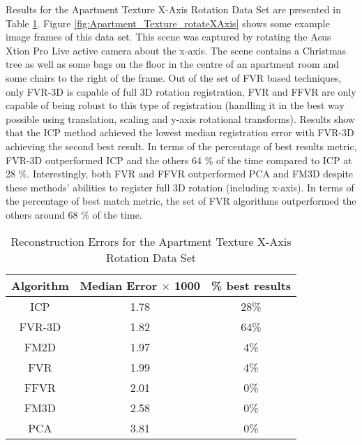 Results for the Apartment Texture X-Axis Rotation Data Set are presented in Table \ref{tab:apartmenttexturex-axisrotation}. Figure \ref{fig:Apartment_Texture_rotateXAxis} shows some example image frames of this data set. This scene was captured by rotating the Asus Xtion Pro Live active camera about the x-axis. The scene contains a Christmas tree as well as some bags on the floor in the centre of an apartment room and some chairs to the right of the frame. Out of the set of FVR based techniques, only FVR-3D is capable of full 3D rotation registration, FVR and FFVR are only capable of being robust to this type of registration (handling it in the best way possible using translation, scaling and y-axis rotational transforms). Results show that the ICP method achieved the lowest median registration error with FVR-3D achieving the second best result. In terms of the percentage of best results metric, FVR-3D outperformed ICP and the others 64 \% of the time compared to ICP at 28 \%. Interestingly, both FVR and FFVR outperformed PCA and FM3D despite these methods' abilities to register full 3D rotation (including x-axis). In terms of the percentage of best match metric, the set of FVR algorithms outperformed the others around 68 \% of the time. \\

\begin{table}[t]
\centering
\caption{Reconstruction Errors for the Apartment Texture X-Axis Rotation Data Set}
\begin{tabular}{ccc}
\hline
\textbf{Algorithm} & \textbf{Median Error $\times$ 1000} & \textbf{\% best results}\\ \hline
ICP	& 1.78 & 28\%\\
FVR-3D	& 1.82 & 64\%\\
FM2D	& 1.97 & 4\%\\
FVR	& 1.99 & 4\%\\
FFVR	& 2.01 & 0\%\\
FM3D	& 2.58 & 0\%\\
PCA	& 3.81 & 0\%\\
\end{tabular}
\label{tab:apartmenttexturex-axisrotation}
\end{table} 

